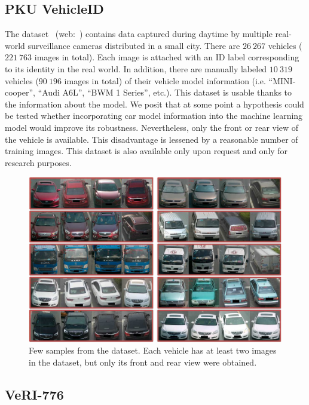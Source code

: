 \subsection{PKU VehicleID}
\label{ssec:DatasetPKUVehicleID}

The  dataset~\cite{liu2016deep} (web:~\cite{pkuvehicleiddataset}) contains data captured during daytime by multiple real-world surveillance cameras distributed in a small city. There are $26\ 267$ vehicles ($221\ 763$ images in total). Each image is attached with an ID label corresponding to its identity in the real world. In addition, there are manually labeled $10\ 319$ vehicles ($90\ 196$ images in total) of their vehicle model information (i.e. “MINI-cooper”, “Audi A6L”, “BWM 1 Series”, etc.). This dataset is usable thanks to the information about the model. We posit that at some point a hypothesis could be tested whether incorporating car model information into the machine learning model would improve its robustness. Nevertheless, only the front or rear view of the vehicle is available. This disadvantage is lessened by a reasonable number of training images. This dataset is also available only upon request and only for research purposes.

\begin{figure}[t]
    \centerline{\includegraphics[width=0.5\linewidth]{figures/datasets/vehicleid_overview.pdf}}
    \caption[ dataset]{Few samples from the  dataset. Each vehicle has at least two images in the dataset, but only its front and rear view were obtained. }
    \label{fig:DatasetVehicleID}
\end{figure}

\subsection{VeRI-776}
\label{ssec:DatasetVeRI776}

